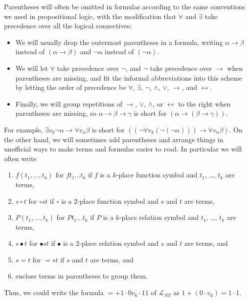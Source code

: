 \documentclass[12pt]{amsbook}
\newcommand{\fromto}{\leftrightarrow}
\theoremstyle{plain}
\theoremstyle{definition}
\theoremstyle{remark}
\begin{document}
Parentheses   will often be omitted in formulas according to the same conventions we used in propositional logic,  with the modification that $\forall$ and $\exists$ take precedence over all the logical connectives:
\begin{itemize}
\item  We will usually drop the outermost parentheses in a formula,  writing $\alpha \to \beta$ instead of $(\alpha \to \beta)$ and $\lnot \alpha$ instead of $(\lnot \alpha)$.  
\item We will let $\forall$ take precedence over $\lnot$,  and $\lnot$ take precedence over $\to$ when parentheses are missing,  and fit the informal abbreviations into this scheme by letting the order of precedence be $\forall$,  $\exists$,  $\lnot$,  $\land$,  $\lor$,  $\to$,  and $\fromto$.
\item Finally,  we will group repetitions of $\to$,  $\lor$,  $\land$,  or $\fromto$  to the right when parentheses are missing,  so  $\alpha \to \beta \to \gamma$ is short for $(\alpha \to (\beta \to \gamma))$.  
\end{itemize}
For example,  $\exists v_k \lnot \alpha \to \forall v_n \beta$ is short for $((\lnot \forall v_k (\lnot (\lnot\alpha))) \to \forall v_n \beta)$.  On the other hand,  we will sometimes add parentheses and arrange things in unofficial ways to make terms and formulas easier to read.  In particular we will often write
\begin{enumerate}
\item $f(t_1,\dots,t_k)$ for $ft_1\dots t_k$ if $f$ is a $k$-place function symbol and $t_1$, \dots,  $t_k$ are terms,
\item $s \circ t$ for $\circ st$ if $\circ$ is a $2$-place function symbol and $s$ and $t$ are terms,  
\item $P(t_1, \dots, t_k)$ for $Pt_1 \dots t_k$ if $P$ is a $k$-place relation symbol and $t_1$, \dots,  $t_k$ are terms,   
\item $s \bullet t$ for $\bullet st$ if $\bullet$ is a $2$-place relation symbol and $s$ and $t$ are terms,  and
\item $s=t$ for $=st$ if $s$ and $t$ are terms,  and
\item enclose terms in parentheses to group them.
\end{enumerate}
Thus,  we could write the formula $= +1 \cdot 0 v_6 \cdot 11$ of $\mathcal{L}_{NT}$ as $1 + (0 \cdot v_6) = 1 \cdot 1$.
\end{document}
